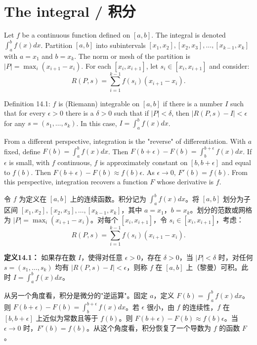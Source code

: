 \section{The integral / 积分}

\begin{original}
Let $f$ be a continuous function defined on $[a, b]$. The integral is denoted $\int_a^b f(x)dx$. Partition $[a, b]$ into subintervals $[x_1, x_2], [x_2, x_3], \dots, [x_{k-1}, x_k]$ with $a = x_1$ and $b = x_k$. The norm or mesh of the partition is $|P| = \max_i(x_{i+1} - x_i)$. For each $[x_i, x_{i+1}]$, let $s_i \in [x_i, x_{i+1}]$ and consider:
\[
R(P, s) = \sum_{i=1}^{k-1} f(s_i)(x_{i+1} - x_i). \tag{14.1}
\]

Definition 14.1: $f$ is (Riemann) integrable on $[a, b]$ if there is a number $I$ such that for every $\epsilon > 0$ there is a $\delta > 0$ such that if $|P| < \delta$, then $|R(P, s) - I| < \epsilon$ for any $s = (s_1, \dots, s_k)$. In this case, $I = \int_a^b f(x)dx$.

From a different perspective, integration is the "reverse" of differentiation. With $a$ fixed, define $F(b) = \int_a^b f(x)dx$. Then $F(b + \epsilon) - F(b) = \int_b^{b+\epsilon} f(x)dx$. If $\epsilon$ is small, with $f$ continuous, $f$ is approximately constant on $[b, b+\epsilon]$ and equal to $f(b)$. Then $F(b+\epsilon)-F(b) \approx f(b)\epsilon$. As $\epsilon \to 0$, $F'(b) = f(b)$. From this perspective, integration recovers a function $F$ whose derivative is $f$.
\end{original}
\begin{translation}
令 $f$ 为定义在 $[a, b]$ 上的连续函数。积分记为 $\int_a^b f(x)dx$。将 $[a, b]$ 划分为子区间 $[x_1, x_2], [x_2, x_3], \dots, [x_{k-1}, x_k]$，其中 $a = x_1$，$b = x_k$。划分的范数或网格为 $|P| = \max_i(x_{i+1} - x_i)$。对每个 $[x_i, x_{i+1}]$，令 $s_i \in [x_i, x_{i+1}]$，考虑：
\[
R(P, s) = \sum_{i=1}^{k-1} f(s_i)(x_{i+1} - x_i). \tag{14.1}
\]

\textbf{定义14.1：} 如果存在数 $I$，使得对任意 $\epsilon > 0$，存在 $\delta > 0$，当 $|P| < \delta$ 时，对任何 $s = (s_1, \dots, s_k)$ 均有 $|R(P, s) - I| < \epsilon$，则称 $f$ 在 $[a, b]$ 上（黎曼）可积。此时 $I = \int_a^b f(x)dx$。

从另一个角度看，积分是微分的"逆运算"。固定 $a$，定义 $F(b) = \int_a^b f(x)dx$。则 $F(b + \epsilon) - F(b) = \int_b^{b+\epsilon} f(x)dx$。若 $\epsilon$ 很小，由 $f$ 的连续性，$f$ 在 $[b, b+\epsilon]$ 上近似为常数且等于 $f(b)$。则 $F(b+\epsilon)-F(b) \approx f(b)\epsilon$。当 $\epsilon \to 0$ 时，$F'(b) = f(b)$。从这个角度看，积分恢复了一个导数为 $f$ 的函数 $F$。
\end{translation}

